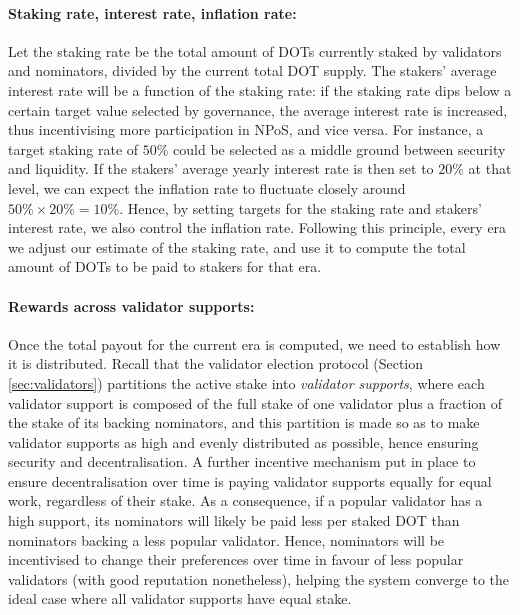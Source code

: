 \documentclass{article}
\begin{document}
\paragraph{Staking rate, interest rate, inflation rate:} Let the staking rate be the total amount of DOTs 
currently staked by validators and nominators, divided by the current total DOT supply. 
The stakers' average interest rate will be a function of the staking rate: 
if the staking rate dips below a certain target value selected by governance, 
the average interest rate is increased, thus incentivising more participation in NPoS, and vice versa. 
For instance, a target staking rate of $50\%$ could be selected as a middle ground between security and liquidity. 
If the stakers' average yearly interest rate is then set to $20\%$ at that level, 
we can expect the inflation rate to fluctuate closely around $50\%\times 20\% = 10\%$. 
Hence, by setting targets for the staking rate and stakers' interest rate, we also control the inflation rate. 
Following this principle, every era we adjust our estimate of the staking rate, 
and use it to compute the total amount of DOTs to be paid to stakers for that era.

\paragraph{Rewards across validator supports:} 
Once the total payout for the current era is computed, we need to establish how it is distributed.
Recall that the validator election protocol (Section \ref{sec:validators}) partitions the active stake into 
\emph{validator supports}, where each validator support is composed of the full stake of one validator 
plus a fraction of the stake of its backing nominators, and this partition is made so as to make validator supports 
as high and evenly distributed as possible, hence ensuring security and decentralisation. 
A further incentive mechanism put in place to ensure decentralisation over time 
is paying validator supports equally for equal work, regardless of their stake. 
As a consequence, if a popular validator has a high support, its nominators will likely be paid less per staked DOT 
than nominators backing a less popular validator. Hence, nominators will be incentivised to change their preferences 
over time in favour of less popular validators (with good reputation nonetheless), helping the system converge to the ideal case where all validator supports have equal stake.
\end{document}
